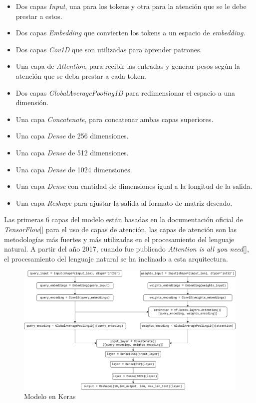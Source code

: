 \begin{itemize}
    \item Dos capas \textit{Input}, una para los tokens y otra para la atención que se le debe prestar a estos.
    \item Dos capas \textit{Embedding} que convierten los tokens a un espacio de \textit{embedding}.
    \item Dos capas \textit{Cov1D} que son utilizadas para aprender patrones.
    \item Una capa de \textit{Attention}, para recibir las entradas y generar pesos seg\'un la atenci\'on que se deba prestar a cada token.
    \item Dos capas \textit{GlobalAveragePooling1D} para redimensionar el espacio a una dimensión.
    \item Una capa \textit{Concatenate}, para concatenar ambas capas superiores.
    \item Una capa \textit{Dense} de 256 dimensiones.
    \item Una capa \textit{Dense} de 512 dimensiones.
    \item Una capa \textit{Dense} de 1024 dimensiones.
    \item Una capa \textit{Dense} con cantidad de dimensiones igual a la longitud de la salida.
    \item Una capa \textit{Reshape} para ajustar la salida al formato de matriz deseado.
\end{itemize}
Las primeras 6 capas del modelo están basadas en la documentación oficial de \textit{TensorFlow}[\cite{tensorflow}] para el uso de capas de atención, las capas de atenci\'on son las metodolog\'ias m\'as fuertes y m\'as utilizadas en el procesamiento del lenguaje natural. A partir del a\~no 2017, cuando fue publicado \textit{Attention is all you need}[\cite{transformers}], el procesamiento del lenguaje natural se ha inclinado a esta arquitectura.

\begin{figure}[H]
\centering
 \includegraphics[width=\textwidth]{Graphics/model.png}
 \caption{Modelo en Keras}
 \label{fig:modelo}
\end{figure}

